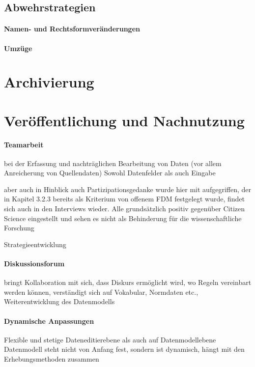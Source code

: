 \paragraph{}
\subsection{Abwehrstrategien}
\paragraph{Namen- und Rechtsformveränderungen}
\paragraph{Umzüge}
\section{Archivierung}
\section{Veröffentlichung und Nachnutzung}

\paragraph{Teamarbeit}
bei der Erfassung und nachträglichen Bearbeitung von Daten (vor allem Anreicherung von Quellendaten)
Sowohl Datenfelder als auch Eingabe

aber auch in Hinblick auch Partizipationsgedanke wurde hier mit aufgegriffen, der in Kapitel 3.2.3 bereits als Kriterium von offenem FDM festgelegt wurde, findet sich auch in den Interviews wieder. Alle grundsätzlich positiv gegenüber Citizen Science eingestellt und sehen es nicht als Behinderung für die wissenschaftliche Forschung 

Strategieentwicklung

\paragraph{Diskussionsforum}
bringt Kollaboration mit sich, dass Diskurs ermöglicht wird, wo Regeln vereinbart werden können, verständigt sich auf Vokabular, Normdaten etc., Weiterentwicklung des Datenmodells
\paragraph{Dynamische Anpassungen}
Flexible und stetige 
Dateneditierebene als auch auf Datenmodellebene
Datenmodell steht nicht von Anfang fest, sondern ist dynamisch, hängt mit den Erhebungsmethoden zusammen
